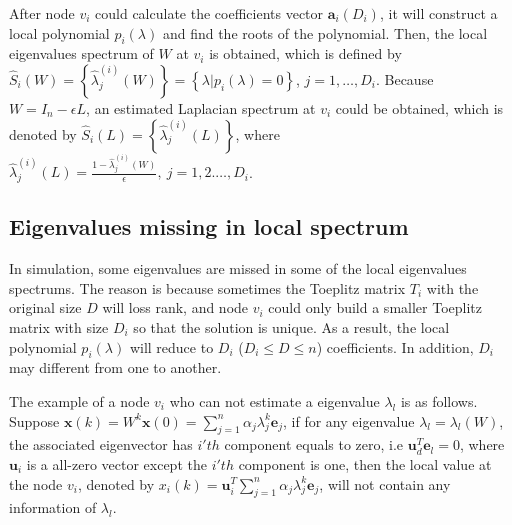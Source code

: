 After node $v_{i}$ could calculate the coefficients vector $\mathbf{a}_{i}\left(D_{i}\right)$,
it will construct a local polynomial $p_{i}\left(\lambda\right)$
and find the roots of the polynomial. Then, the local eigenvalues
spectrum of $W$ at $v_{i}$ is obtained, which is defined by $\hat{S}_{i}\left(W\right)=\left\{ \hat{\lambda}_{j}^{\left(i\right)}\left(W\right)\right\} =\left\{ \lambda|p_{i}\left(\lambda\right)=0\right\} $,
 $j=1,\ldots,D_{i}$. Because $W=I_{n}-\epsilon L$, an estimated
Laplacian spectrum at $v_{i}$ could be obtained, which is denoted
by $\hat{S}_{i}\left(L\right)=\left\{ \hat{\lambda}_{j}^{\left(i\right)}\left(L\right)\right\} $,
where $\hat{\lambda}_{j}^{\left(i\right)}\left(L\right)=\frac{1-\hat{\lambda}_{j}^{\left(i\right)}\left(W\right)}{\epsilon},\ j=1,2.\ldots,D_{i}$.


\subsection{Eigenvalues missing in local spectrum }

In simulation, some eigenvalues are missed in some of the local eigenvalues
spectrums. The reason is because sometimes the Toeplitz matrix $T_{i}$
with the original size $D$ will loss rank, and node $v_{i}$ could
only build a smaller Toeplitz matrix with size $D_{i}$ so that the
solution is unique. As a result, the local polynomial $p_{i}\left(\lambda\right)$
will reduce to $D_{i}$ ($D_{i}\leq D\leq n$) coefficients. In addition,
$D_{i}$ may different from one to another.

The example of a node $v_{i}$ who can not estimate a eigenvalue $\lambda_{l}$
is as follows. Suppose $\mathbf{x}\left(k\right)=W^{k}\mathbf{x}\left(0\right)=\sum_{j=1}^{n}\alpha_{j}\lambda_{j}^{k}\mathbf{e}_{j}$,
if for any eigenvalue $\lambda_{l}=\lambda_{l}\left(W\right)$, the
associated eigenvector has $i'th$ component equals to zero, i.e $\mathbf{u}_{d}^{T}\mathbf{e}_{l}=0$,
where $\mathbf{u}_{i}$ is a all-zero vector except the $i'th$ component
is one, then the local value at the node $v_{i}$, denoted by $x_{i}\left(k\right)=\mathbf{u}_{i}^{T}\sum_{j=1}^{n}\alpha_{j}\lambda_{j}^{k}\mathbf{e}_{j}$,
will not contain any information of $\lambda_{l}$. 

